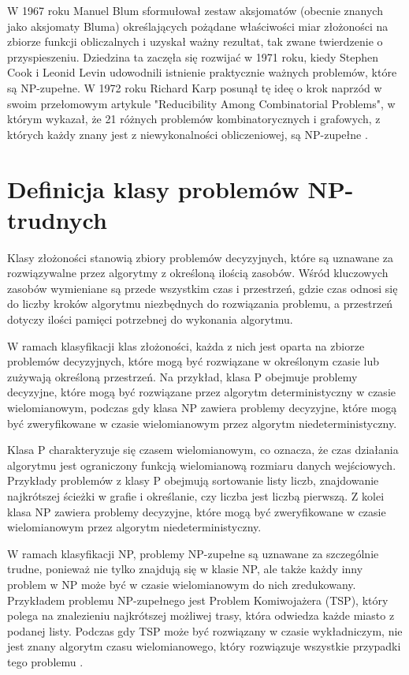 W 1967 roku Manuel Blum sformułował zestaw aksjomatów (obecnie znanych jako aksjomaty Bluma) określających pożądane właściwości miar złożoności na zbiorze funkcji obliczalnych i uzyskał ważny rezultat, tak zwane twierdzenie o przyspieszeniu. Dziedzina ta zaczęła się rozwijać w 1971 roku, kiedy Stephen Cook i Leonid Levin udowodnili istnienie praktycznie ważnych problemów, które są NP-zupełne. W 1972 roku Richard Karp posunął tę ideę o krok naprzód w swoim przełomowym artykule "Reducibility Among Combinatorial Problems", w którym wykazał, że 21 różnych problemów kombinatorycznych i grafowych, z których każdy znany jest z niewykonalności obliczeniowej, są NP-zupełne \cite{Karp86}.

\section{Definicja klasy problemów NP-trudnych}

Klasy złożoności stanowią zbiory problemów decyzyjnych, które są uznawane za rozwiązywalne przez algorytmy z określoną ilością zasobów. Wśród kluczowych zasobów wymieniane są przede wszystkim czas i przestrzeń, gdzie czas odnosi się do liczby kroków algorytmu niezbędnych do rozwiązania problemu, a przestrzeń dotyczy ilości pamięci potrzebnej do wykonania algorytmu.

W ramach klasyfikacji klas złożoności, każda z nich jest oparta na zbiorze problemów decyzyjnych, które mogą być rozwiązane w określonym czasie lub zużywają określoną przestrzeń. Na przykład, klasa P obejmuje problemy decyzyjne, które mogą być rozwiązane przez algorytm deterministyczny w czasie wielomianowym, podczas gdy klasa NP zawiera problemy decyzyjne, które mogą być zweryfikowane w czasie wielomianowym przez algorytm niedeterministyczny.

Klasa P charakteryzuje się czasem wielomianowym, co oznacza, że czas działania algorytmu jest ograniczony funkcją wielomianową rozmiaru danych wejściowych. Przykłady problemów z klasy P obejmują sortowanie listy liczb, znajdowanie najkrótszej ścieżki w grafie i określanie, czy liczba jest liczbą pierwszą. Z kolei klasa NP zawiera problemy decyzyjne, które mogą być zweryfikowane w czasie wielomianowym przez algorytm niedeterministyczny.

W ramach klasyfikacji NP, problemy NP-zupełne są uznawane za szczególnie trudne, ponieważ nie tylko znajdują się w klasie NP, ale także każdy inny problem w NP może być w czasie wielomianowym do nich zredukowany. Przykładem problemu NP-zupełnego jest Problem Komiwojażera (TSP), który polega na znalezieniu najkrótszej możliwej trasy, która odwiedza każde miasto z podanej listy. Podczas gdy TSP może być rozwiązany w czasie wykładniczym, nie jest znany algorytm czasu wielomianowego, który rozwiązuje wszystkie przypadki tego problemu \cite{medium:complexity-classes}.

